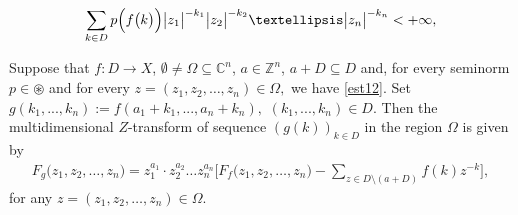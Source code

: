 \documentclass[10pt,a4paper]{amsart}
\begin{document}
\begin{align}\label{est12}
\sum _{k\in D }p\Bigl(f\bigl(k\bigr)\Bigr)\bigl|z_{1}\bigr|^{-k_{1}}\bigl|z_{2}\bigr|^{-k_{2}}\ldots \bigl| z_{n}\bigr|^{-k_{n}}<+\infty ,
\end{align} 

\begin{prop}\label{manulakis}
Suppose that $f: D \rightarrow X$, $\emptyset \neq \Omega \subseteq {\mathbb C}^{n}$, $a\in {\mathbb Z}^{n}$, $a+D\subseteq D$ and, for every seminorm $p\in \circledast$ and for every $z=(z_{1},z_{2},\ldots ,z_{n})\in \Omega ,$ we have \eqref{est12}. Set $g(k_{1},...,k_{n}):=f(a_{1}+k_{1},...,a_{n}+k_{n}),$ $(k_{1},...,k_{n})\in D.$
Then the multidimensional $Z$-transform of sequence $(g(k))_{k\in D}$ in the region $\Omega$
is given by
\begin{align}\label{est121shift}
F_{g}\bigl(z_{1},z_{2},\ldots ,z_{n}\bigr)=z_{1}^{a_{1}}\cdot z_{2} ^{a_{2}}\ldots z_{n}^{a_{n}}\Biggl[ F_{f}\bigl(z_{1},z_{2},\ldots ,z_{n}\bigr)-\sum_{z\in D\setminus (a+D)}f(k)z^{-k}\Biggr],
\end{align}
for any $z=(z_{1},z_{2},\ldots ,z_{n})\in \Omega.$
\end{prop}
\end{document}
